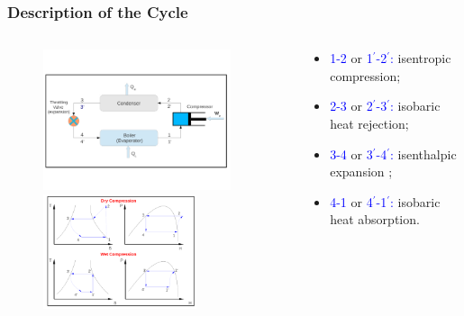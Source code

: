 \documentclass[10pt,compress]{beamer}
\begin{document}
\begin{frame}
 \frametitle{Description of the Cycle}
  \begin{columns}
   \begin{column}[c]{0.5\linewidth}
    \begin{figure}%
     \vbox{
      \includegraphics[width=5.5cm,clip]{./Pics/Overview_Refrig12}
      \vspace{-.5cm}
      \includegraphics[width=4.5cm,clip]{./Pics/Overview_Refrig13}}
    \end{figure}  
   \end{column}  
   \begin{column}[c]{0.5\linewidth}
  \begin{itemize}
   \item <1-> \textcolor{blue}{1-2} or \textcolor{blue}{1$^{\prime}$-2$^{\prime}$:} isentropic compression;
   \item <1-> \textcolor{blue}{2-3} or \textcolor{blue}{2$^{\prime}$-3$^{\prime}$:} isobaric heat rejection;
   \item <1-> \textcolor{blue}{3-4} or \textcolor{blue}{3$^{\prime}$-4$^{\prime}$:} isenthalpic expansion ;%
   \item <1-> \textcolor{blue}{4-1} or \textcolor{blue}{4$^{\prime}$-1$^{\prime}$:} isobaric heat absorption.
  \end{itemize}
 \end{column}  
\end{columns}
\end{frame}
\end{document}
